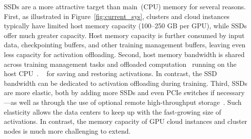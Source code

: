 SSDs are a more attractive target than main~(CPU) memory for several reasons. First, as illustrated in Figure~\ref{fig:current_sys}, clusters and cloud instances~\cite{microsoftNDA100V4series2024,googleGPUMachineTypes,ncsaDeltaProjectProfile} typically have limited host memory capacity (100--250 GB per GPU), while SSDs offer much greater capacity. Host memory capacity is further consumed by input data, checkpointing buffers, and other training management buffers, leaving even less capacity for activation offloading.  Second, host memory bandwidth is shared across training management tasks and offloaded computation~\cite{kamahoriFiddlerCPUGPUOrchestration2024,renZeROOffloadDemocratizingBillionScale2021,songPowerInferFastLarge2023} running on the host CPU~. ~\cite{baeFlashNeuronSSDEnabledLargeBatch2021} for saving and restoring activations. In contrast, the SSD bandwidth can be dedicated to activation offloading during training. 
Third, SSDs are more elastic, both by adding more SSDs and even PCIe switches if necessary---as well as through the use of optional remote high-throughput storage~\cite{googleGoogleCloudHyperdisk,lockwoodArchitecturePerformancePerlmutter2024}. Such elasticity allows the data centers to keep up with the fast-growing size of activations. In contrast, the memory capacity of GPU cloud instances and cluster nodes is much more challenging to extend. 


